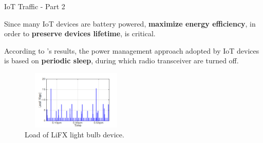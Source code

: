 \documentclass[10pt]{beamer}
\begin{document}
\begin{frame}{IoT Traffic - Part 2}

\begin{block}{}
\justifying
Since many IoT devices are battery powered, \textbf{maximize energy efficiency}, in order to \textbf{preserve devices lifetime}, is critical. 
\end{block}

\begin{block}{}
\justifying
According to \citet{ITPAReport}'s results, the power management approach adopted by IoT devices is based on \textbf{periodic sleep}, during which radio transceiver are turned off.
\end{block}

\begin{figure}
  \includegraphics[width=150pt, height=80pt]{SleepTime.png}
  \caption{Load of LiFX light bulb device.}
  \label{fig1}
\end{figure}

\end{frame} 
\end{document}
